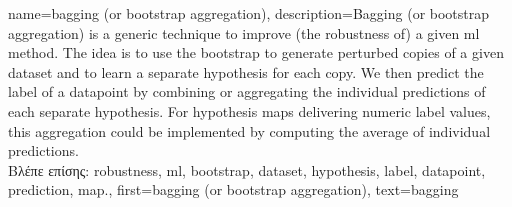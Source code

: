 {name={bagging (or bootstrap aggregation)},
	description={Bagging (or bootstrap aggregation) 
		is a generic technique to improve (the \gls{robustness} of) a given \gls{ml} method. 
		The idea is to use the \gls{bootstrap} to generate perturbed copies of a given \gls{dataset} 
		and to learn a separate \gls{hypothesis} for each copy. We then predict the 
		\gls{label} of a \gls{datapoint} by combining or aggregating the individual \gls{prediction}s 
		of each separate \gls{hypothesis}. For \gls{hypothesis} \gls{map}s delivering numeric \gls{label} 
		values, this aggregation could be implemented by computing the average of individual 
		\gls{prediction}s.\\
		\foreignlanguage{greek}{Βλέπε επίσης:} \gls{robustness}, \gls{ml}, \gls{bootstrap}, \gls{dataset}, 
		\gls{hypothesis}, \gls{label}, \gls{datapoint}, \gls{prediction}, \gls{map}.},
	first={bagging (or bootstrap aggregation)},
	text={bagging}  
}

